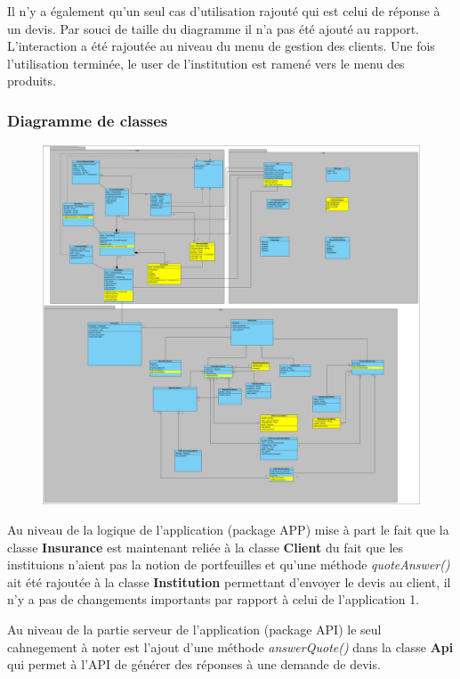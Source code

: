 \documentclass[../rapport.tex]{subfiles}
\begin{document}
		Il n'y a également qu'un seul cas d'utilisation rajouté qui est celui de réponse à un
		devis. Par souci de taille du diagramme il n'a pas été ajouté au rapport. L'interaction
		a été rajoutée au niveau du menu de gestion des clients. Une fois l'utilisation terminée,
		le user de l'institution est ramené vers le menu des produits.

		\subsubsection{Diagramme de classes}

				\begin{figure}[h]
						\centering\includegraphics[scale=0.15]{ressources/photos_diagrammes/extensionThomas/class2ExtensionThomas.jpg}
				\end{figure}
		Au niveau de la logique de l'application (package APP) mise à part le fait que la classe 
		\textbf{Insurance} est maintenant reliée à la classe \textbf{Client} du fait que les 
		instituions n'aient pas la notion de portfeuilles et qu'une méthode \textit{quoteAnswer()}
		ait été rajoutée à la classe \textbf{Institution} permettant d'envoyer le devis au client,
		il n'y a pas de changements importants par rapport à celui de l'application 1. 

		\bigskip

		Au niveau de la partie serveur de l'application (package API) le seul cahnegement à noter
		est l'ajout d'une méthode \textit{answerQuote()} dans la classe \textbf{Api} qui permet
		à l'API de générer des réponses à une demande de devis.
\end{document}
